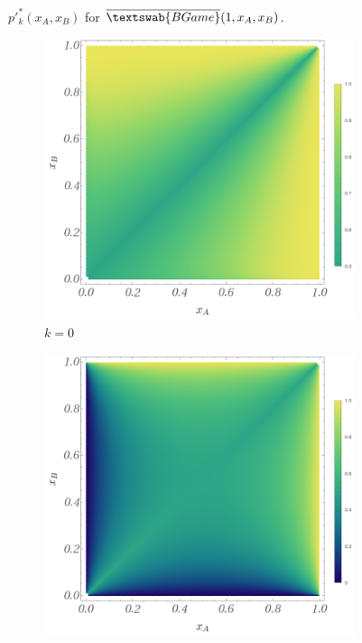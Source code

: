 \documentclass{article}
\theoremstyle{definition}
\newcommand{\InfBG}[1]{$\overline{\textswab{BGame}}(#1)$}
\begin{document}
\begin{figure}[H]
    \caption{$p'^*_k(x_A,x_B)$ for \InfBG{1,x_A,x_B}.}
    \label{fig:ppk_InfBG_1_01}
\end{figure}


\begin{figure}[H]
    \centering
    \begin{subfigure}[b]{0.3\textwidth}
        \includegraphics[width=\textwidth]{img/BinomialBayesian_ppk_2_0.png}
        \caption{$k=0$}
        \label{fig:ppkBG_2_0}
    \end{subfigure}
    \hspace{0.01\textwidth} %
    \begin{subfigure}[b]{0.3\textwidth}
        \includegraphics[width=\textwidth]{img/BinomialBayesian_ppk_2_1.png}

\end{subfigure}
\end{figure}
\end{document}
